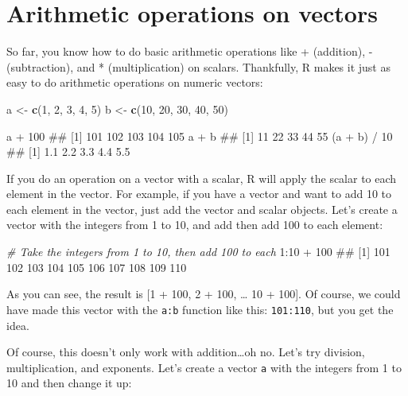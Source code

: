 \documentclass[]{book}
\newenvironment{Shaded}{\begin{snugshade}}{\end{snugshade}}
\newcommand{\KeywordTok}[1]{\textcolor[rgb]{0.13,0.29,0.53}{\textbf{{#1}}}}
\newcommand{\DecValTok}[1]{\textcolor[rgb]{0.00,0.00,0.81}{{#1}}}
\newcommand{\StringTok}[1]{\textcolor[rgb]{0.31,0.60,0.02}{{#1}}}
\newcommand{\CommentTok}[1]{\textcolor[rgb]{0.56,0.35,0.01}{\textit{{#1}}}}
\newcommand{\NormalTok}[1]{{#1}}
\theoremstyle{definition}
\theoremstyle{definition}
\theoremstyle{remark}
\begin{document}
\section{Arithmetic operations on
vectors}\label{arithmetic-operations-on-vectors}

So far, you know how to do basic arithmetic operations like +
(addition), - (subtraction), and * (multiplication) on scalars.
Thankfully, R makes it just as easy to do arithmetic operations on
numeric vectors:

\begin{Shaded}
\begin{Highlighting}[]
\NormalTok{a <-}\StringTok{ }\KeywordTok{c}\NormalTok{(}\DecValTok{1}\NormalTok{, }\DecValTok{2}\NormalTok{, }\DecValTok{3}\NormalTok{, }\DecValTok{4}\NormalTok{, }\DecValTok{5}\NormalTok{)}
\NormalTok{b <-}\StringTok{ }\KeywordTok{c}\NormalTok{(}\DecValTok{10}\NormalTok{, }\DecValTok{20}\NormalTok{, }\DecValTok{30}\NormalTok{, }\DecValTok{40}\NormalTok{, }\DecValTok{50}\NormalTok{)}

\NormalTok{a +}\StringTok{ }\DecValTok{100}
\NormalTok{## [1] 101 102 103 104 105}
\NormalTok{a +}\StringTok{ }\NormalTok{b}
\NormalTok{## [1] 11 22 33 44 55}
\NormalTok{(a +}\StringTok{ }\NormalTok{b) /}\StringTok{ }\DecValTok{10}
\NormalTok{## [1] 1.1 2.2 3.3 4.4 5.5}
\end{Highlighting}
\end{Shaded}

If you do an operation on a vector with a scalar, R will apply the
scalar to each element in the vector. For example, if you have a vector
and want to add 10 to each element in the vector, just add the vector
and scalar objects. Let's create a vector with the integers from 1 to
10, and add then add 100 to each element:

\begin{Shaded}
\begin{Highlighting}[]
\CommentTok{# Take the integers from 1 to 10, then add 100 to each}
\DecValTok{1}\NormalTok{:}\DecValTok{10} \NormalTok{+}\StringTok{ }\DecValTok{100}
\NormalTok{##  [1] 101 102 103 104 105 106 107 108 109 110}
\end{Highlighting}
\end{Shaded}

As you can see, the result is {[}1 + 100, 2 + 100, \ldots{} 10 + 100{]}.
Of course, we could have made this vector with the \texttt{a:b} function
like this: \texttt{101:110}, but you get the idea.

Of course, this doesn't only work with addition\ldots{}oh no. Let's try
division, multiplication, and exponents. Let's create a vector
\texttt{a} with the integers from 1 to 10 and then change it up:
\end{document}
